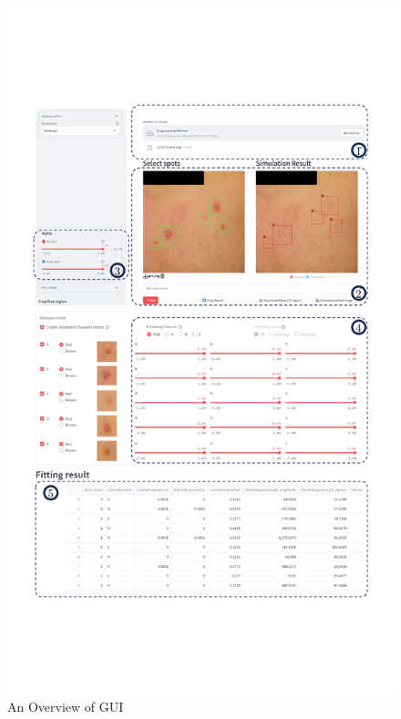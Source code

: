 \begin{spacing}{1.5}
\begin{figure}[t!]
    \centering
    \includegraphics[width=0.93\columnwidth]{Chapter3/GUI.pdf}
    \caption{An Overview of GUI}
    \label{fig:gui}
\end{figure}

\end{spacing}
